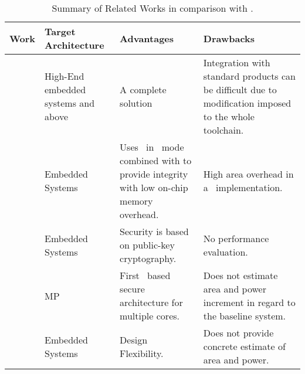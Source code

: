 \begin{table*}[!b]
	\center
	\caption{Summary of Related Works in comparison with \cshia.}
	\label{tab:related-work}
	\footnotesize
	\begin{tabular}{cp{1in}p{2in}p{2in}}

		\hline
			Work & Target Architecture & Advantages & Drawbacks \\	
		\hline
		\hline
			\aegis\cite{Suh2005} & High-End embedded systems and above & A complete solution & Integration with standard products can be difficult due to modification imposed to the whole toolchain. \\
		\hline
			\cite{Vaslin2009:OTP} & Embedded Systems & Uses \aes~in \otp~mode combined with \crc32 to provide integrity with low on-chip memory overhead. & High area overhead in a \fpga~implementation. \\
		\hline
			\cite{Bobade2015:SecurityFPGA} & Embedded Systems & Security is based on public-key cryptography. & No performance evaluation.\\
		\hline
			\cite{Sepulveda2018:CSHIA} & MP\soc & First \puf~based secure architecture for multiple cores. & Does not estimate area and power increment in regard to the baseline system.\\
		\hline
			\cshia & Embedded Systems & Design Flexibility. & Does not provide concrete estimate of area and power. \\
		\hline
	\end{tabular}
\end{table*}